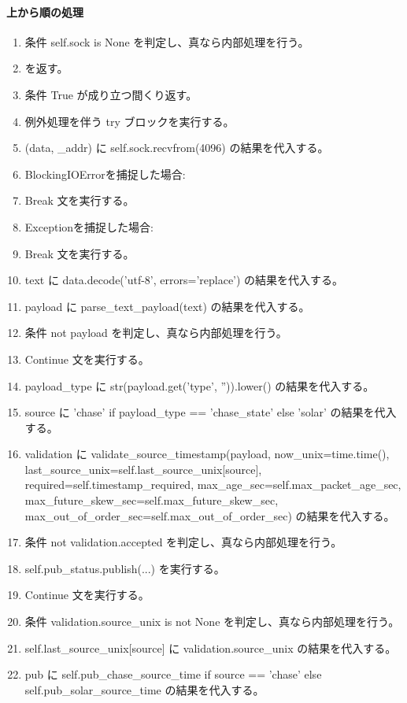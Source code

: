 \documentclass[a4paper,11pt]{article}
\begin{document}
            \paragraph{上から順の処理}
            \begin{enumerate}[leftmargin=1.8em]
            \item 条件 self.sock is None を判定し、真なら内部処理を行う。
\item    を返す。
\item 条件 True が成り立つ間くり返す。
\item   例外処理を伴う try ブロックを実行する。
\item     (data, \_addr) に self.sock.recvfrom(4096) の結果を代入する。
\item     BlockingIOErrorを捕捉した場合:
\item     Break 文を実行する。
\item     Exceptionを捕捉した場合:
\item     Break 文を実行する。
\item   text に data.decode('utf-8', errors='replace') の結果を代入する。
\item   payload に parse\_text\_payload(text) の結果を代入する。
\item   条件 not payload を判定し、真なら内部処理を行う。
\item     Continue 文を実行する。
\item   payload\_type に str(payload.get('type', '')).lower() の結果を代入する。
\item   source に 'chase' if payload\_type == 'chase\_state' else 'solar' の結果を代入する。
\item   validation に validate\_source\_timestamp(payload, now\_unix=time.time(), last\_source\_unix=self.last\_source\_unix[source], required=self.timestamp\_required, max\_age\_sec=self.max\_packet\_age\_sec, max\_future\_skew\_sec=self.max\_future\_skew\_sec, max\_out\_of\_order\_sec=self.max\_out\_of\_order\_sec) の結果を代入する。
\item   条件 not validation.accepted を判定し、真なら内部処理を行う。
\item     self.pub\_status.publish(...) を実行する。
\item     Continue 文を実行する。
\item   条件 validation.source\_unix is not None を判定し、真なら内部処理を行う。
\item     self.last\_source\_unix[source] に validation.source\_unix の結果を代入する。
\item     pub に self.pub\_chase\_source\_time if source == 'chase' else self.pub\_solar\_source\_time の結果を代入する。

\end{enumerate}
\end{document}
